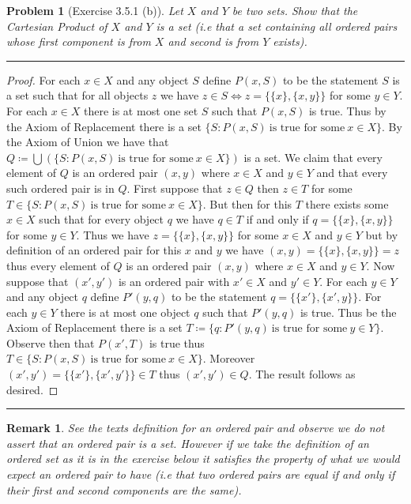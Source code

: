 \documentclass{article}
\newcommand{\lined}{\noindent\rule{\textwidth}{1pt}}
\newtheorem*{problem}{Problem}
\newtheorem*{remark}{Remark}
\begin{document}
	\begin{problem}[Exercise 3.5.1 (b)]
		Let $X$ and $Y$ be two sets. Show that the Cartesian Product of $X$ and $Y$ is a set (i.e that a set containing
		all ordered pairs whose first component is from $X$ and second is from $Y$ exists).
	\end{problem}

	\lined
	\begin{proof}
		For each $x \in X$ and any object $S$ define $P(x,S)$ to be the statement $S$ is a set such that for all objects $z$ we have
		$z \in S \iff z = \{\{x\},\{x,y\}\}$ for some $y \in Y$. For each $x \in X$ there is at most one set $S$ such that $P(x,S)$ is true. Thus by the Axiom of Replacement there is a set $\{S:P(x,S)\ \text{is true for some}\ x \in X\}$. By the Axiom of 
		Union we have that $Q \coloneqq \bigcup (\{S:P(x,S)\ \text{is true for some}\ x \in X\})$ is a set. We claim that every element of $Q$ is an ordered pair $(x,y)$ where $x \in X$ and $y \in Y$ and that every such ordered pair is in $Q$. First suppose that $z \in Q$ then $z \in T$ for some $T \in \{S:P(x,S)\ \text{is true for some}\ x \in X\}$. But then for this $T$ there exists some $x \in X$ such that for every object $q$ we have $q \in T$ if and only if $q = \{\{x\},\{x,y\}\}$ for some $y \in Y$. Thus we have $z = \{\{x\},\{x,y\}\}$ for some $x \in X$ and $y \in Y$ but by definition of an ordered pair for this $x$ and $y$ we have $(x,y) = \{\{x\},\{x,y\}\} = z$ thus every element of $Q$ is an ordered pair $(x,y)$ where $x \in X$ and $y \in Y$. Now suppose that $(x',y')$ is an ordered pair with $x' \in X$ and $y' \in Y$. For each $y \in Y$ and any object $q$ define $P'(y,q)$ to be the statement $q = \{\{x'\},\{x',y\}\}$. For each $y \in Y$ there is at most one object $q$ such that $P'(y,q)$ is true. Thus be the Axiom of Replacement there is a set $T \coloneqq \{q:P'(y,q)\ \text{is true for some}\ y \in Y\}$. Observe then that $P(x',T)$ is true thus $T \in \{S:P(x,S)\ \text{is true for some}\ x \in X\}$. Moreover $(x',y') = \{\{x'\},\{x',y'\}\} \in T$ thus $(x',y') \in Q$. The result follows as desired.
		 
	\end{proof}
	\lined
	
	\newpage
	
	\begin{remark}
		See the texts definition for an ordered pair and observe we do not assert that an ordered pair is a set. However if we take the definition of an ordered set as it is in the exercise below it satisfies the property of what we would expect an ordered pair to have (i.e that two ordered pairs are equal if and only if their first and second components are the same).
	\end{remark}
	
\end{document}

